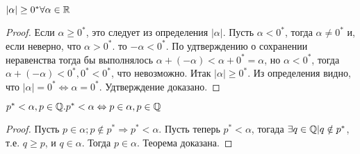 \documentclass[main]{subfiles}
\begin{document}
\begin{assertion}
    $|\alpha| \geq 0^* \forall \alpha \in \mathbb{R}$
\end{assertion}
\begin{proof}
    Если $\alpha \geq 0^*$, это следует из определения $|\alpha|$. Пусть
    $\alpha < 0^*$, тогда $\alpha \neq 0^*$ и, если неверно, что $\alpha > 0^*$.
    то $-\alpha < 0^*$. По удтверждению о сохранении неравенства тогда бы 
    выполнялось $\alpha + (-\alpha) < \alpha + 0^* = \alpha$, но $\alpha < 0^*$,
    тогда $\alpha + (-\alpha) < 0^*, 0^* < 0^*$, что невозможно. Итак 
    $|\alpha| \geq 0^*$. Из определения видно, что $|\alpha| = 0^* \Leftrightarrow
    \alpha = 0^*$. Удтверждение доказано.
\end{proof}

\begin{theorem}
    $p^* < \alpha, p \in \mathbb{Q}. p^* < \alpha \Leftrightarrow p \in \alpha, p \in \mathbb{Q}$
\end{theorem}
\begin{proof}
    Пусть $p \in \alpha; p \notin p^* \Rightarrow p^* < \alpha$. Пусть теперь
    $p^* < \alpha$, тогада $\exists q \in \mathbb{Q} | q \notin p^*$, т.е. $q \geq p$, 
    и $q \in \alpha$. Тогда $p \in \alpha$. Теорема доказана.
\end{proof}
\end{document}
